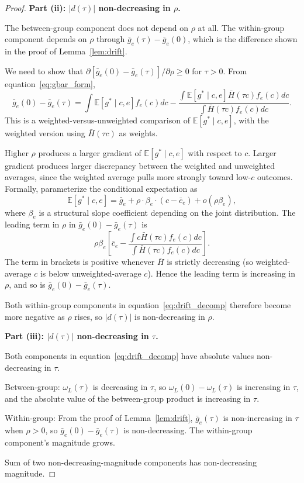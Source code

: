 \begin{proof}
\textbf{Part (ii): $|d(\tau)|$ non-decreasing in $\rho$.}

The between-group component does not depend on $\rho$ at all. The within-group component depends on $\rho$ through $\bar g_e(\tau) - \bar g_e(0)$, which is the difference shown in the proof of Lemma~\ref{lem:drift}.

We need to show that $\partial[\bar g_e(0) - \bar g_e(\tau)]/\partial \rho \geq 0$ for $\tau > 0$. From equation~\eqref{eq:gbar_form},
\[
\bar g_e(0) - \bar g_e(\tau) = \int \mathbb{E}[g^* \mid c, e] f_e(c) dc - \frac{\int \mathbb{E}[g^* \mid c, e] \bar H(\tau c) f_e(c) dc}{\int \bar H(\tau c) f_e(c) dc}.
\]
This is a weighted-versus-unweighted comparison of $\mathbb{E}[g^* \mid c, e]$, with the weighted version using $\bar H(\tau c)$ as weights.

Higher $\rho$ produces a larger gradient of $\mathbb{E}[g^* \mid c, e]$ with respect to $c$. Larger gradient produces larger discrepancy between the weighted and unweighted averages, since the weighted average pulls more strongly toward low-$c$ outcomes. Formally, parameterize the conditional expectation as
\[
\mathbb{E}[g^* \mid c, e] = \bar g_e + \rho \cdot \beta_e \cdot (c - \bar c_e) + o(\rho \beta_e),
\]
where $\beta_e$ is a structural slope coefficient depending on the joint distribution. The leading term in $\rho$ in $\bar g_e(0) - \bar g_e(\tau)$ is
\[
\rho \beta_e \left[ \bar c_e - \frac{\int c \bar H(\tau c) f_e(c) dc}{\int \bar H(\tau c) f_e(c) dc} \right].
\]
The term in brackets is positive whenever $\bar H$ is strictly decreasing (so weighted-average $c$ is below unweighted-average $c$). Hence the leading term is increasing in $\rho$, and so is $\bar g_e(0) - \bar g_e(\tau)$.

Both within-group components in equation~\eqref{eq:drift_decomp} therefore become more negative as $\rho$ rises, so $|d(\tau)|$ is non-decreasing in $\rho$.

\textbf{Part (iii): $|d(\tau)|$ non-decreasing in $\tau$.}

Both components in equation~\eqref{eq:drift_decomp} have absolute values non-decreasing in $\tau$.

Between-group: $\omega_L(\tau)$ is decreasing in $\tau$, so $\omega_L(0) - \omega_L(\tau)$ is increasing in $\tau$, and the absolute value of the between-group product is increasing in $\tau$.

Within-group: From the proof of Lemma~\ref{lem:drift}, $\bar g_e(\tau)$ is non-increasing in $\tau$ when $\rho > 0$, so $\bar g_e(0) - \bar g_e(\tau)$ is non-decreasing. The within-group component's magnitude grows.

Sum of two non-decreasing-magnitude components has non-decreasing magnitude.
\end{proof}

